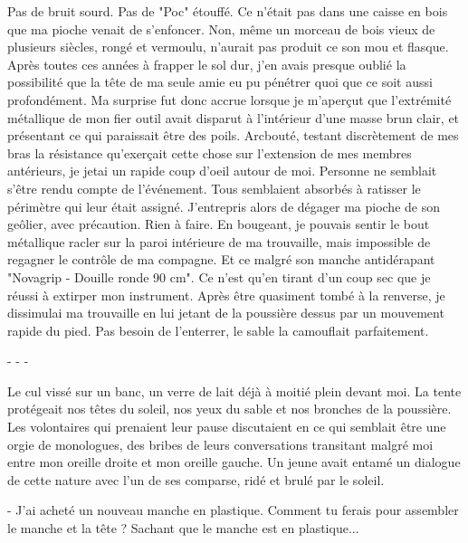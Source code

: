 \documentclass[12pt,a4paper,article]{memoir} %
\begin{document}
Pas de bruit sourd. Pas de "Poc" \'{e}touff\'{e}. Ce n'\'{e}tait pas dans une caisse en bois que ma pioche venait de s'enfoncer. Non, m\^{e}me un morceau de bois vieux de plusieurs si\`{e}cles, rong\'{e} et vermoulu, n'aurait pas produit ce son mou et flasque. Apr\`{e}s toutes ces ann\'{e}es \`{a} frapper le sol dur, j'en avais presque oubli\'{e} la possibilit\'{e} que la t\^{e}te de ma seule amie eu pu p\'{e}n\'{e}trer quoi que ce soit aussi profond\'{e}ment. Ma surprise fut donc accrue lorsque je m'aper\c{c}ut que l'extr\'{e}mit\'{e} m\'{e}tallique de mon fier outil avait disparut \`{a} l'int\'{e}rieur d'une masse brun clair, et pr\'{e}sentant ce qui paraissait \^{e}tre des poils. Arcbout\'{e}, testant discr\`{e}tement de mes bras la r\'{e}sistance qu'exer\c{c}ait cette chose sur l'extension de mes membres ant\'{e}rieurs, je jetai un rapide coup d'oeil autour de moi. Personne ne semblait s'\^{e}tre rendu compte de l'\'{e}v\'{e}nement. Tous semblaient absorb\'{e}s \`{a} ratisser le p\'{e}rim\`{e}tre qui leur \'{e}tait assign\'{e}. J'entrepris alors de d\'{e}gager ma pioche de son ge\^{o}lier, avec pr\'{e}caution. Rien \`{a} faire. En bougeant, je pouvais sentir le bout m\'{e}tallique racler sur la paroi int\'{e}rieure de ma trouvaille, mais impossible de regagner le contr\^{o}le de ma compagne. Et ce malgr\'{e} son manche antid\'{e}rapant "Novagrip - Douille ronde 90 cm". Ce n'est qu'en tirant d'un coup sec que je r\'{e}ussi \`{a} extirper mon instrument. Apr\`{e}s \^{e}tre quasiment tomb\'{e} \`{a} la renverse, je dissimulai ma trouvaille en lui jetant de la poussi\`{e}re dessus par un mouvement rapide du pied. Pas besoin de l'enterrer, le sable la camouflait parfaitement.

\centerline{- - -}

Le cul viss\'{e} sur un banc, un verre de lait d\'{e}j\`{a} \`{a} moiti\'{e} plein devant moi. La tente prot\'{e}geait nos t\^{e}tes du soleil, nos yeux du sable et nos bronches de la poussi\`{e}re. Les volontaires qui prenaient leur pause discutaient en ce qui semblait \^{e}tre une orgie de monologues, des bribes de leurs conversations transitant malgr\'{e} moi entre mon oreille droite et mon oreille gauche. Un jeune avait entam\'{e} un dialogue de cette nature avec l'un de ses comparse, rid\'{e} et brul\'{e} par le soleil.
\newline

	- J'ai achet\'{e} un nouveau manche en plastique.\newline
	Comment tu ferais pour assembler le manche et la t\^{e}te ?\newline
	Sachant que le manche est en plastique...\newline
	
\end{document}
